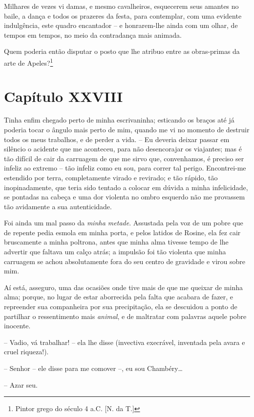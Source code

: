  Milhares de vezes vi damas, e mesmo cavalheiros, esquecerem seus
amantes no baile, a dança e todos os prazeres da festa, para
contemplar, com uma evidente indulgência, este quadro encantador -- e
honrarem-lhe ainda com um olhar, de tempos em tempos, no meio da
contradança mais animada.

 Quem poderia então disputar o posto que lhe atribuo entre as
obras-primas da arte de Apeles?\footnote{ Pintor grego do século 4 a.C. [N. da T.]} 

\section{Capítulo XXVIII}

 Tinha enfim chegado perto de minha escrivaninha; esticando os braços
até já poderia tocar o ângulo mais perto de mim, quando me vi no
momento de destruir todos os meus trabalhos, e de perder a vida. -- Eu
deveria deixar passar em silêncio o acidente que me aconteceu, para não
desencorajar os viajantes; mas é tão difícil de cair da carruagem de
que me sirvo que, convenhamos, é preciso ser infeliz ao extremo --
tão infeliz como eu sou, para correr tal perigo. Encontrei-me estendido
por terra, completamente virado e revirado; e tão rápido, tão
inopinadamente, que teria sido tentado a colocar em dúvida a minha
infelicidade, se pontadas na cabeça e uma dor violenta no ombro
esquerdo não me provassem tão avidamente a sua autenticidade.

 Foi ainda um mal passo da \textit{minha metade}. Assustada pela voz de
um pobre que de repente pedia esmola em minha porta, e pelos latidos de
Rosine, ela fez cair bruscamente a minha poltrona, antes que minha alma
tivesse tempo de lhe advertir que faltava um calço atrás; a impulsão
foi tão violenta que minha carruagem se achou absolutamente fora do seu
centro de gravidade e virou sobre mim.

 Aí está, asseguro, uma das ocasiões onde tive mais de que me queixar de
minha alma; porque, no lugar de estar aborrecida pela falta que acabara
de fazer, e repreender sua companheira por sua precipitação, ela se
descuidou a ponto de partilhar o ressentimento mais \textit{animal}, e
de maltratar com palavras aquele pobre inocente.

 -- Vadio, vá trabalhar! -- ela lhe disse (invectiva execrável,
inventada pela avara e cruel riqueza!).

 -- Senhor -- ele disse para me comover --, eu sou Chambéry\ldots

 -- Azar seu.

